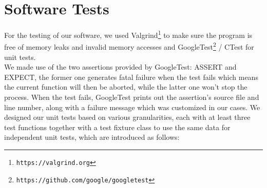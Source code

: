 \documentclass{book}
\begin{document}
\section{Software Tests}
For the testing of our software, we used Valgrind\footnote{\tt https://valgrind.org} to make sure the program is free of memory leaks and invalid memory accesses and GoogleTest\footnote{\tt https://github.com/google/googletest} / CTest for unit tests. \\
We made use of the two assertions provided by GoogleTest\cite{googletest}: ASSERT and EXPECT, the former one generates fatal failure when the test fails which means the current function will then be aborted, while the latter one won't stop the process. When the test fails, GoogleTest prints out the assertion's source file and line number, along with a failure message which was customized in our cases. We designed our unit tests based on various granularities, each with at least three test functions together with a test fixture class to use the same data for independent unit tests, which are introduced as follows: 
\end{document}
